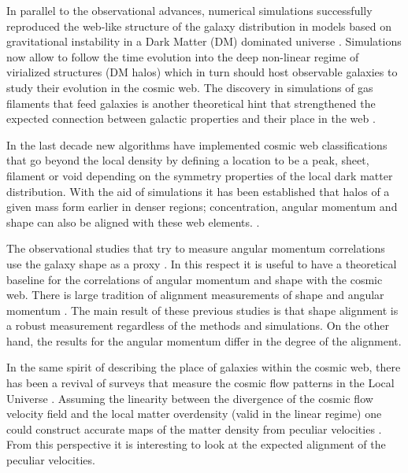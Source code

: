 \documentclass[useAMS,usenatbib]{mn2e}
\begin{document}
In parallel to the observational advances, numerical simulations
successfully reproduced the web-like structure of the galaxy
distribution in models based on gravitational instability in a Dark
Matter (DM) dominated universe
\citep[e.g.][]{Bond1996,Colberg2005}. Simulations now allow to follow
the time evolution into the deep non-linear regime of virialized
structures (DM halos) which in turn should host observable
galaxies to study their evolution in the cosmic web. The discovery in
simulations of gas filaments that feed galaxies is another theoretical
hint that strengthened the expected connection between galactic
properties and their place in the web \citep{Ocvirk2008,Dekel2009}.  


In the last decade new algorithms have implemented cosmic web
classifications that go beyond the local density by defining a
location to be a peak, sheet, filament or void depending on the
symmetry properties of the local dark matter distribution. With the
aid of simulations it has been established that halos of a given mass
form earlier in denser regions; concentration, angular momentum and shape can also
be aligned with these web elements. \citep[e.g][]{Hahn2007,Sousbie2008b,Tweb,Gonzalez2010,Noh2011}.   

The observational studies that try to measure angular momentum correlations
use the galaxy shape as a proxy  \citep{Lee2002,Lee2007,Jones2010,Paz2008}. In
this respect it is useful to have a theoretical baseline for the
correlations of angular momentum and shape with the cosmic web.  There
is large tradition of alignment measurements of shape and angular momentum
\citep[e.g.][]{Hahn2007,AragonCalvo2007,Zhang2009,Paz2010,Codis2012,Trowland2013,Libeskind2013}. The
main result of these previous studies is that shape alignment is a
robust measurement regardless of the methods and simulations. On the
other hand, the results for the angular momentum differ in the degree
of the alignment.  

In the same spirit of describing the place of galaxies within the
cosmic web, there has been a revival of surveys that measure the
cosmic flow patterns in the Local Universe
\citep{Nusser2011,Tully2013}. Assuming the linearity between the
divergence of the cosmic flow velocity field and the local matter
overdensity (valid in the linear regime) one could construct accurate
maps of the matter density from peculiar velocities
\citep{Courtois2012}. From this perspective it is interesting to look
at the expected alignment of the peculiar velocities.
\end{document}
